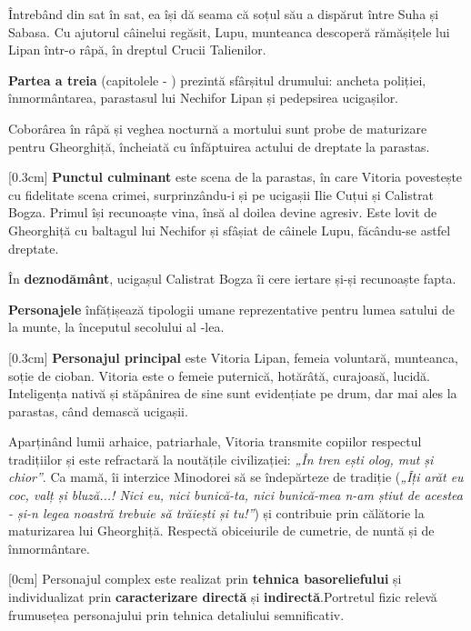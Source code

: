 \documentclass[
12pt,
a4paper
]{article}
\newcommand{\rom}[1]{\uppercase\expandafter{\romannumeral #1\relax}} %
\begin{document}
Întrebând din sat în sat, ea își dă seama că soțul său a dispărut între Suha și Sabasa. Cu ajutorul câinelui regăsit, Lupu, munteanca descoperă rămășițele lui Lipan într-o râpă, în dreptul Crucii Talienilor.

\textbf{Partea a treia} (capitolele \rom{14} - \rom{16}) prezintă sfârșitul drumului: ancheta poliției, înmormântarea, parastasul lui Nechifor Lipan și pedepsirea ucigașilor.

Coborârea în râpă și veghea nocturnă a mortului sunt probe de maturizare pentru Gheorghiță, încheiată cu înfăptuirea actului de dreptate la parastas.

[0.3cm]
\textbf{Punctul culminant} este scena de la parastas, în care Vitoria povestește cu fidelitate scena crimei, surprinzându-i și pe ucigașii Ilie Cuțui și Calistrat Bogza. Primul își recunoaște vina, însă al doilea devine agresiv. Este lovit de Gheorghiță cu baltagul lui Nechifor și sfâșiat de câinele Lupu, făcându-se astfel dreptate.

În \textbf{deznodământ}, ucigașul Calistrat Bogza îi cere iertare și-și recunoaște fapta.

\textbf{Personajele} înfățișează tipologii umane reprezentative pentru lumea satului de la munte, la începutul secolului al \rom{20}-lea.

[0.3cm]
\textbf{Personajul principal} este Vitoria Lipan, femeia voluntară, munteanca, soție de cioban. Vitoria este o femeie puternică, hotărâtă, curajoasă, lucidă. Inteligența nativă și stăpânirea de sine sunt evidențiate pe drum, dar mai ales la parastas, când demască ucigașii.

Aparținând lumii arhaice, patriarhale, Vitoria transmite copiilor respectul tradițiilor și este refractară la noutățile civilizației: \textit{„În tren ești olog, mut și chior”}. Ca mamă, îi interzice Minodorei să se îndepărteze de tradiție (\textit{„Îți arăt eu coc, valț și bluză...! Nici eu, nici bunică-ta, nici bunică-mea n-am știut de acestea - și-n legea noastră trebuie să trăiești și tu!”}) și contribuie prin călătorie la maturizarea lui Gheorghiță. Respectă obiceiurile de cumetrie, de nuntă și de înmormântare.

[0cm]
Personajul complex este realizat prin \textbf{tehnica basoreliefului} și individualizat prin \textbf{caracterizare directă} și \textbf{indirectă}.Portretul fizic relevă frumusețea personajului prin tehnica detaliului semnificativ.
\end{document}
